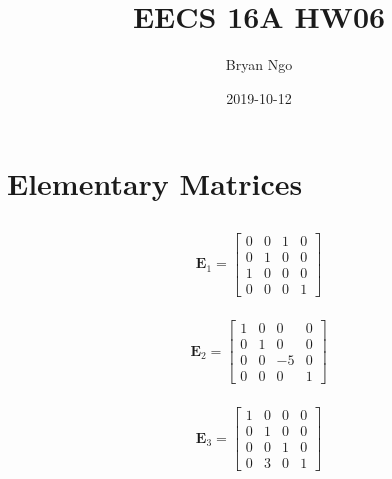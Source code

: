 \documentclass[]{article}
\title{EECS 16A HW06}
\author{Bryan Ngo}
\date{2019-10-12}
\begin{document}
\maketitle

\section{Elementary Matrices}

\subsection{}

\subsubsection{}

\begin{equation}
	\mathbf{E}_1 = \begin{bmatrix}
	0 & 0 & 1 & 0 \\
	0 & 1 & 0 & 0 \\
	1 & 0 & 0 & 0 \\
	0 & 0 & 0 & 1
	\end{bmatrix}
\end{equation}

\subsubsection{}

\begin{equation}
	\mathbf{E}_2 = \begin{bmatrix}
	1 & 0 & 0 & 0 \\
	0 & 1 & 0 & 0 \\
	0 & 0 & -5 & 0 \\
	0 & 0 & 0 & 1
	\end{bmatrix}
\end{equation}

\subsubsection{}

\begin{equation}
	\mathbf{E}_3 = \begin{bmatrix}
	1 & 0 & 0 & 0 \\
	0 & 1 & 0 & 0 \\
	0 & 0 & 1 & 0 \\
	0 & 3 & 0 & 1
	\end{bmatrix}
\end{equation}
\end{document}
